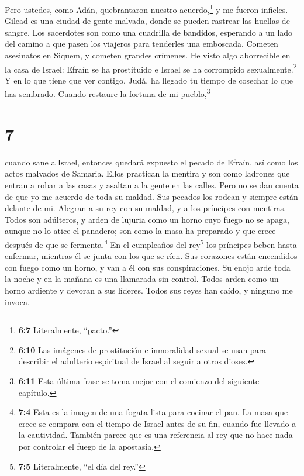  Pero ustedes, como Adán, quebrantaron nuestro
acuerdo,\footnote{\textbf{6:7} Literalmente, ``pacto.''} y me fueron
infieles.  Gilead es una ciudad de gente malvada, donde se
pueden rastrear las huellas de sangre.  Los sacerdotes son
como una cuadrilla de bandidos, esperando a un lado del camino a que
pasen los viajeros para tenderles una emboscada. Cometen asesinatos en
Siquem, y cometen grandes crímenes.  He visto algo
aborrecible en la casa de Israel: Efraín se ha prostituido e Israel se
ha corrompido sexualmente.\footnote{\textbf{6:10} Las imágenes de
  prostitución e inmoralidad sexual se usan para describir el adulterio
  espiritual de Israel al seguir a otros dioses.}  Y en lo
que tiene que ver contigo, Judá, ha llegado tu tiempo de cosechar lo que
has sembrado. Cuando restaure la fortuna de mi pueblo,\footnote{\textbf{6:11}
  Esta última frase se toma mejor con el comienzo del siguiente
  capítulo.}

\hypertarget{section-6}{%
\section{7}\label{section-6}}

 cuando sane a Israel, entonces quedará expuesto el pecado
de Efraín, así como los actos malvados de Samaria. Ellos practican la
mentira y son como ladrones que entran a robar a las casas y asaltan a
la gente en las calles.  Pero no se dan cuenta de que yo me
acuerdo de toda su maldad. Sus pecados los rodean y siempre están
delante de mi.  Alegran a su rey con su maldad, y a los
príncipes con mentiras.  Todos son adúlteros, y arden de
lujuria como un horno cuyo fuego no se apaga, aunque no lo atice el
panadero; son como la masa ha preparado y que crece después de que se
fermenta.\footnote{\textbf{7:4} Esta es la imagen de una fogata lista
  para cocinar el pan. La masa que crece se compara con el tiempo de
  Israel antes de su fin, cuando fue llevado a la cautividad. También
  parece que es una referencia al rey que no hace nada por controlar el
  fuego de la apostasía.}  En el cumpleaños del
rey\footnote{\textbf{7:5} Literalmente, ``el día del rey.''} los
príncipes beben hasta enfermar, mientras él se junta con los que se
ríen.  Sus corazones están encendidos con fuego como un
horno, y van a él con sus conspiraciones. Su enojo arde toda la noche y
en la mañana es una llamarada sin control.  Todos arden como
un horno ardiente y devoran a sus líderes. Todos sus reyes han caído, y
ninguno me invoca.

